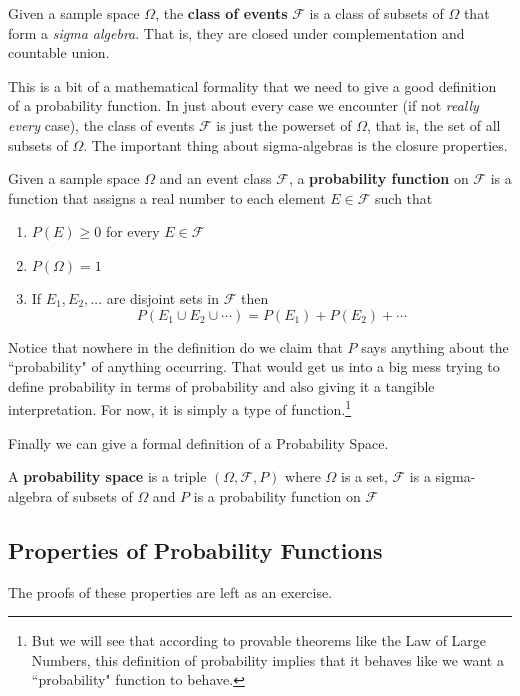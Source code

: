 \documentclass[../main.tex]{subfiles}
\begin{document}
\begin{definition} Given a sample space $\Omega$, the
	\textbf{class of events} $\mathcal{F}$ is a
	class of subsets of $\Omega$ that form a \textit{sigma algebra}.
	That is, they are closed under complementation and countable union.
\end{definition}

This is a bit of a mathematical formality that we need to give a good definition of a probability function. In just about every case we encounter (if not \textit{really every} case), the class of events $\mathcal{F}$ is just the powerset of $\Omega$, that is, the set
of all subsets of $\Omega$. The important thing about sigma-algebras is the closure properties. 

\begin{definition} Given a sample space $\Omega$ and 
	an event class $\mathcal{F}$, a \textbf{probability function}
	on $\mathcal{F}$ is a function that assigns a real number to
	each element $E \in \mathcal{F}$ such that
	\begin{enumerate}
		\item $P(E) \geq 0$ for every $E \in \mathcal{F}$
		\item $P(\Omega) = 1$
		\item If $E_1, E_2, \ldots$ are disjoint sets
		in $\mathcal{F}$ then
		$$P(E_1 \cup E_2 \cup \cdots) = 
		P(E_1)+P(E_2) + \cdots$$
	\end{enumerate}
\end{definition}

Notice that nowhere in the definition do we claim that $P$ says 
anything about the ``probability" of anything occurring. That would
get us into a big mess trying to define probability in terms
of probability and also giving it a tangible interpretation. For now,
it is simply a type of function.\footnote{But we will see that
	according to provable theorems like the Law of Large Numbers,
	this definition of probability implies that it behaves like
	we want a ``probability" function to behave.}

Finally we can give a formal definition of a Probability Space.

\begin{definition}
	A \textbf{probability space} is a triple $(\Omega, \mathcal{F},
	P)$ where $\Omega$ is a set, $\mathcal{F}$ is a sigma-algebra
	of subsets of $\Omega$ and $P$ is a probability function 
	on $\mathcal{F}$
\end{definition}

\subsection{Properties of Probability Functions}
The proofs of these properties are left as an exercise.
\end{document}
